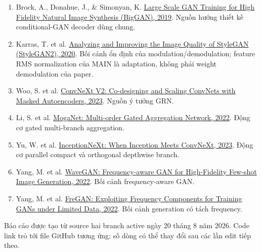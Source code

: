 \documentclass[10pt,a4paper]{article}
\newcommand{\paper}[2]{\href{#1}{#2}}
\begin{document}
\begin{enumerate}[leftmargin=1.6em,itemsep=3pt]
  \item Brock, A., Donahue, J., \& Simonyan, K. \paper{https://arxiv.org/abs/1809.11096}{Large Scale GAN Training for High Fidelity Natural Image Synthesis (BigGAN), 2019}. Nguồn hướng thiết kế conditional-GAN decoder dùng chung.
  \item Karras, T. et al. \paper{https://arxiv.org/abs/1912.04958}{Analyzing and Improving the Image Quality of StyleGAN (StyleGAN2), 2020}. Bối cảnh ổn định của modulation/demodulation; feature RMS normalization của MAIN là adaptation, không phải weight demodulation của paper.
  \item Woo, S. et al. \paper{https://arxiv.org/abs/2301.00808}{ConvNeXt V2: Co-designing and Scaling ConvNets with Masked Autoencoders, 2023}. Nguồn ý tưởng GRN.
  \item Li, S. et al. \paper{https://arxiv.org/abs/2211.03295}{MogaNet: Multi-order Gated Aggregation Network, 2022}. Động cơ gated multi-branch aggregation.
  \item Yu, W. et al. \paper{https://arxiv.org/abs/2303.16900}{InceptionNeXt: When Inception Meets ConvNeXt, 2023}. Động cơ parallel compact và orthogonal depthwise branch.
  \item Yang, M. et al. \paper{https://arxiv.org/abs/2207.07288}{WaveGAN: Frequency-aware GAN for High-Fidelity Few-shot Image Generation, 2022}. Bối cảnh frequency-aware GAN.
  \item Yang, M. et al. \paper{https://arxiv.org/abs/2210.05461}{FreGAN: Exploiting Frequency Components for Training GANs under Limited Data, 2022}. Bối cảnh generation có tách frequency.
\end{enumerate}

\vfill
\begin{center}
\footnotesize\color{gray!70!black}
Báo cáo được tạo từ source hai branch active ngày 20 tháng 8 năm 2026. Code link trỏ tới file GitHub tương ứng; số dòng có thể thay đổi sau các lần edit tiếp theo.
\end{center}
\end{document}

